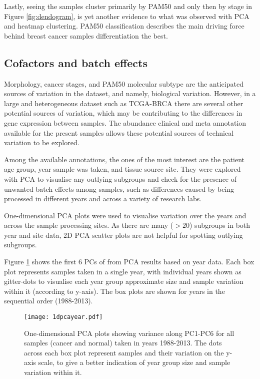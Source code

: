     Lastly, seeing the samples cluster primarily by PAM50 and only then by stage in Figure \ref{fig:dendogram}, is yet another evidence to what was observed with PCA and heatmap clustering. PAM50 classification describes the main driving force behind breast cancer samples differentiation the best.  
    

    
    \newpage
    \subsection{Cofactors and batch effects}
    
    Morphology, cancer stages, and PAM50 molecular subtype are the anticipated sources of variation in the dataset, and namely, biological variation. However, in a large and heterogeneous dataset such as TCGA-BRCA there are several other potential sources of variation, which may be contributing to the differences in gene expression between samples. The abundance clinical and meta annotation available for the present samples allows these potential sources of technical variation to be explored.
    
    Among the available annotations, the ones of the most interest are the patient age group, year sample was taken, and tissue source site. They were explored with PCA to visualise any outlying subgroups and check for the presence of unwanted batch effects among samples, such as differences caused by being processed in different years and across a variety of research labs.
    
    One-dimensional PCA plots were used to visualise variation over the years and across the sample processing sites. As there are many ($>20$) subgroups in both year and site data, 2D PCA scatter plots are not helpful for spotting outlying subgroups. 
    
    Figure \ref{fig:1dpcayear} shows the first 6 PCs of from PCA results based on year data. Each box plot represents samples taken in a single year, with individual years shown as gitter-dots to visualise each year group approximate size and sample variation within it (according to y-axis). The box plots are shown for years in the sequential order (1988-2013). \\
  
        
            \begin{figure}[!h]
            \centering
            \texttt{[image: 1dpcayear.pdf]}
            \caption[1D PCA plot based on year data]{One-dimensional PCA plots showing variance along PC1-PC6 for all samples (cancer and normal) taken in years 1988-2013. The dots across each box plot represent samples and their variation on the y-axis scale, to give a better indication of year group size and sample variation within it.}
            \label{fig:1dpcayear}
            \end{figure}
    
